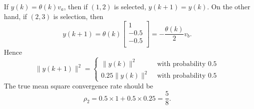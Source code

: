 \documentclass{article}
\begin{document}
If $y(k) = \theta(k) v_a$, then if $(1,2)$ is selected, $y(k+1) = y(k)$. On the other hand, if $(2,3)$ is selection, then
\begin{displaymath}
  y(k+1) = \theta(k)\begin{bmatrix}
1\\
-0.5\\
-0.5\\
  \end{bmatrix} = -\frac{\theta(k)}{2}v_b.
\end{displaymath}
Hence
\begin{displaymath}
  \|y(k+1)\|^2 = \begin{cases}
    \|y(k)\|^2&\text{ with probability }0.5\\
    0.25\|y(k)\|^2&\text{ with probability }0.5
  \end{cases}
\end{displaymath}
The true mean square convergence rate should be
\begin{displaymath}
  \rho_2 = 0.5\times 1 + 0.5\times 0.25 = \frac{5}{8}.  
\end{displaymath}
\end{document}
